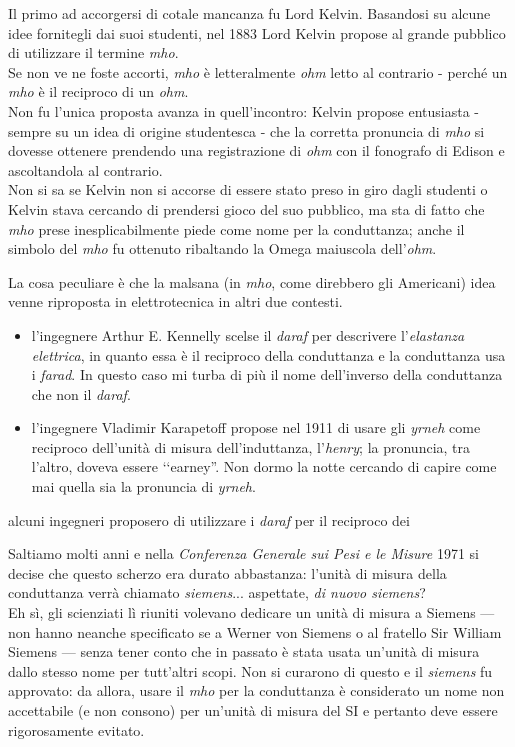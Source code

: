 \begin{digressionwt}
	Il primo ad accorgersi di cotale mancanza fu Lord Kelvin. Basandosi su alcune idee fornitegli dai suoi studenti,  nel 1883 Lord Kelvin propose al grande pubblico di utilizzare il termine \textit{mho}.\\
	Se non ve ne foste accorti, \textit{mho} è letteralmente \textit{ohm} letto al contrario - perché un \textit{mho} è il reciproco di un \textit{ohm}.\\
	Non fu l'unica proposta avanza in quell'incontro: Kelvin propose entusiasta - sempre su un idea di origine studentesca - che la corretta pronuncia di \textit{mho} si dovesse ottenere prendendo una registrazione di \textit{ohm} con il fonografo di Edison e ascoltandola al contrario.\\
	Non si sa se Kelvin non si accorse di essere stato preso in giro dagli studenti o Kelvin stava cercando di prendersi gioco del suo pubblico, ma sta di fatto che \textit{mho} prese inesplicabilmente piede come nome per la conduttanza; anche il simbolo del \textit{mho} fu ottenuto ribaltando la Omega maiuscola dell'\textit{ohm}.

	La cosa peculiare è che la malsana (in \textit{mho}, come direbbero gli Americani) idea venne riproposta in elettrotecnica in altri due contesti.
	\begin{itemize}
		\item l'ingegnere Arthur E. Kennelly scelse il \textit{daraf} per descrivere l'\textit{elastanza elettrica}, in quanto essa è il reciproco della conduttanza e la conduttanza usa i \textit{farad}. In questo caso mi turba di più il nome dell'inverso della conduttanza che non il \textit{daraf}.
		\item l'ingegnere Vladimir Karapetoff propose nel 1911 di usare gli \textit{yrneh} come reciproco dell'unità di misura dell'induttanza, l'\textit{henry}; la pronuncia, tra l'altro, doveva essere ‘‘earney''. Non dormo la notte cercando di capire come mai quella sia la pronuncia di \textit{yrneh}.
	\end{itemize} alcuni ingegneri proposero di utilizzare i \textit{daraf} per il reciproco dei 
	
	Saltiamo molti anni e nella \textit{Conferenza Generale sui Pesi e le Misure} 1971 si decise che questo scherzo era durato abbastanza: l'unità di misura della conduttanza verrà chiamato \textit{siemens}... aspettate, \textit{di nuovo siemens}?\\
	Eh sì, gli scienziati lì riuniti volevano dedicare un unità di misura a Siemens --- non hanno neanche specificato se a Werner von Siemens o al fratello Sir William Siemens --- senza tener conto che in passato è stata usata un'unità di misura dallo stesso nome per tutt'altri scopi. Non si curarono di questo e il \textit{siemens} fu approvato: da allora, usare il \textit{mho} per la conduttanza è considerato un nome non accettabile (e non consono) per un'unità di misura del SI e pertanto deve essere rigorosamente evitato.
	
\end{digressionwt} %
